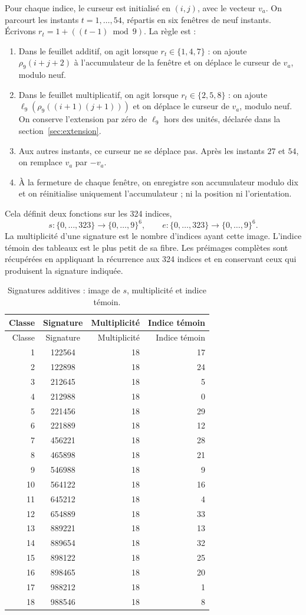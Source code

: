 Pour chaque indice, le curseur est initialisé en \((i,j)\), avec le vecteur \(v_a\).
On parcourt les instants \(t=1,\ldots,54\), répartis en six fenêtres
de neuf instants. Écrivons \(r_t=1+((t-1)\bmod9)\). La règle est :
\begin{enumerate}
\item Dans le feuillet additif, on agit lorsque \(r_t\in\{1,4,7\}\) :
on ajoute \(\rho_9(i+j+2)\) à l’accumulateur de la fenêtre et on
déplace le curseur de \(v_a\), modulo neuf.
\item Dans le feuillet multiplicatif, on agit lorsque \(r_t\in\{2,5,8\}\) :
on ajoute \(\ell_9(\rho_9((i+1)(j+1)))\) et on déplace le curseur
de \(v_a\), modulo neuf. On conserve l’extension par zéro de
\(\ell_9\) hors des unités, déclarée dans la section~\ref{sec:extension}.
\item Aux autres instants, ce curseur ne se déplace pas. Après
les instants \(27\) et \(54\), on remplace \(v_a\) par \(-v_a\).
\item À la fermeture de chaque fenêtre, on enregistre son accumulateur modulo dix
et on réinitialise uniquement l’accumulateur ; ni la position ni l’orientation.
\end{enumerate}
Cela définit deux fonctions sur les 324 indices,
\[
 s:\{0,\ldots,323\}\longrightarrow\{0,\ldots,9\}^6,\qquad
 e:\{0,\ldots,323\}\longrightarrow\{0,\ldots,9\}^6.
\]
La multiplicité d’une signature est le nombre d’indices ayant cette image.
L’indice témoin des tableaux est le plus petit de sa fibre.
Les préimages complètes sont récupérées en appliquant la récurrence aux
324 indices et en conservant ceux qui produisent la signature indiquée.

\begin{longtable}{rcrr}
\caption{Signatures additives : image de \(s\), multiplicité et indice témoin.}
\label{iv:tabla-firmas-aditivas}\\
\toprule
Classe & Signature & Multiplicité & Indice témoin\\
\midrule
\endfirsthead
\toprule
Classe & Signature & Multiplicité & Indice témoin\\
\midrule
\endhead
1&122564&18&17\\
2&122898&18&24\\
3&212645&18&5\\
4&212988&18&0\\
5&221456&18&29\\
6&221889&18&12\\
7&456221&18&28\\
8&465898&18&21\\
9&546988&18&9\\
10&564122&18&16\\
11&645212&18&4\\
12&654889&18&33\\
13&889221&18&13\\
14&889654&18&32\\
15&898122&18&25\\
16&898465&18&20\\
17&988212&18&1\\
18&988546&18&8\\
\bottomrule
\end{longtable}

